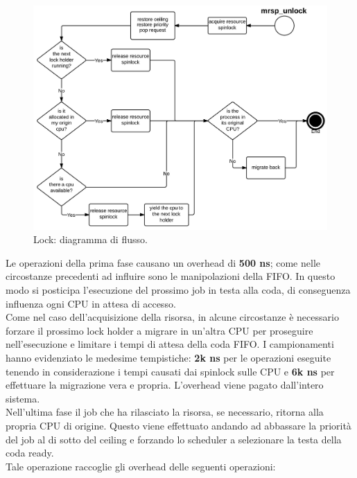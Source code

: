 \begin{figure}
\includegraphics[width=\linewidth]{images/mrsp_unlock.jpeg}
\caption{Lock: diagramma di flusso.}
\label{fig:mrsplock}
\end{figure}

Le operazioni della prima fase causano un overhead di \textbf{500 ns}; come nelle circostanze precedenti ad influire sono le manipolazioni della FIFO. In questo modo si posticipa l'esecuzione del prossimo job in testa alla coda, di conseguenza influenza ogni CPU in attesa di accesso.\\

Come nel caso dell'acquisizione della risorsa, in alcune circostanze è necessario forzare il prossimo lock holder a migrare in un'altra CPU per proseguire nell'esecuzione e limitare i tempi di attesa della coda FIFO. I campionamenti hanno evidenziato le medesime tempistiche: \textbf{2k ns} per le operazioni eseguite tenendo in considerazione i tempi causati dai spinlock sulle CPU e \textbf{6k ns} per effettuare la migrazione vera e propria. L'overhead viene pagato dall'intero sistema.\\

Nell'ultima fase il job che ha rilasciato la risorsa, se necessario, ritorna alla propria CPU di origine. Questo viene effettuato andando ad abbassare la priorità del job al di sotto del ceiling e forzando lo scheduler a selezionare la testa della coda ready.\\

Tale operazione raccoglie gli overhead delle seguenti operazioni:

